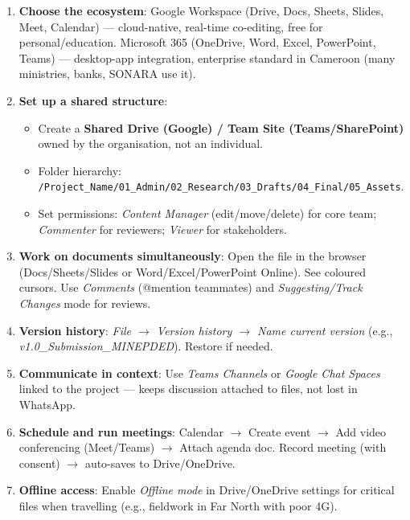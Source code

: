 \documentclass[11pt]{article}
\begin{document}
\begin{methode}
\begin{enumerate}
    \item \textbf{Choose the ecosystem}: Google Workspace (Drive, Docs, Sheets, Slides, Meet, Calendar) — cloud-native, real-time co-editing, free for personal/education. Microsoft 365 (OneDrive, Word, Excel, PowerPoint, Teams) — desktop-app integration, enterprise standard in Cameroon (many ministries, banks, SONARA use it).
    \item \textbf{Set up a shared structure}:
          \begin{itemize}
              \item Create a \textbf{Shared Drive (Google) / Team Site (Teams/SharePoint)} owned by the organisation, not an individual.
              \item Folder hierarchy: \texttt{/Project\_Name/01\_Admin/02\_Research/03\_Drafts/04\_Final/05\_Assets}.
              \item Set permissions: \textit{Content Manager} (edit/move/delete) for core team; \textit{Commenter} for reviewers; \textit{Viewer} for stakeholders.
          \end{itemize}
    \item \textbf{Work on documents simultaneously}: Open the file in the browser (Docs/Sheets/Slides or Word/Excel/PowerPoint Online). See coloured cursors. Use \textit{Comments} (@mention teammates) and \textit{Suggesting/Track Changes} mode for reviews.
    \item \textbf{Version history}: \textit{File $\rightarrow$ Version history $\rightarrow$ Name current version} (e.g., \textit{v1.0\_Submission\_MINEPDED}). Restore if needed.
    \item \textbf{Communicate in context}: Use \textit{Teams Channels} or \textit{Google Chat Spaces} linked to the project — keeps discussion attached to files, not lost in WhatsApp.
    \item \textbf{Schedule and run meetings}: Calendar $\rightarrow$ Create event $\rightarrow$ Add video conferencing (Meet/Teams) $\rightarrow$ Attach agenda doc. Record meeting (with consent) $\rightarrow$ auto-saves to Drive/OneDrive.
    \item \textbf{Offline access}: Enable \textit{Offline mode} in Drive/OneDrive settings for critical files when travelling (e.g., fieldwork in Far North with poor 4G).
\end{enumerate}
\end{methode}
\end{document}
